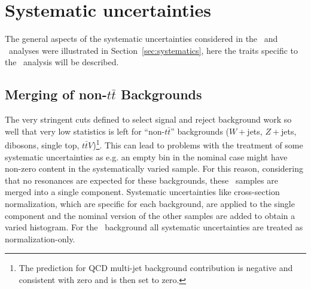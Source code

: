 \section{Systematic uncertainties}\label{sec:wbxSYS}

The general aspects of the systematic uncertainties considered
in the \wbx\ and \htx\ analyses were illustrated
in Section~\ref{sec:systematics}, here the traits specific to the
\wbx\ analysis will be described.

\subsection{Merging of non-$t\bar{t}$ Backgrounds}

The very stringent cuts defined to select signal and reject
background work so well that very low statistics is left for
``non-$t\bar{t}$'' backgrounds ($W+$jets, $Z+$jets, dibosons, single top, 
$t\bar{t}V$)\footnote{The prediction for QCD multi-jet background contribution
is negative and consistent with zero and is then set to zero.}.
This can lead to problems with the treatment of some systematic uncertainties as
e.g. an empty bin in the nominal case might have non-zero content in the
systematically varied sample. For this reason, considering that no resonances
are expected for these backgrounds, these \nontt\ samples are merged into
a single component. Systematic uncertainties like cross-section normalization,
which are specific for each background, are applied to the single component
and the nominal version of the other samples are added to obtain
a varied histogram.
For the \nontt\ background all systematic uncertainties are
treated as normalization-only.


